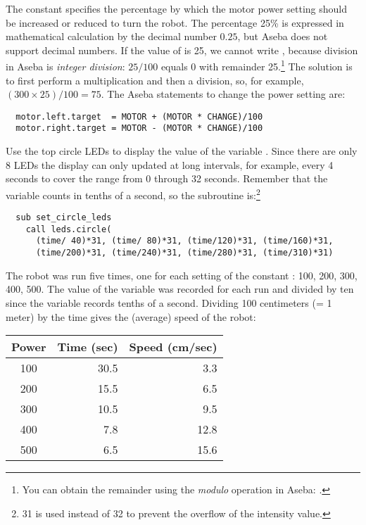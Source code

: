The constant  specifies the percentage by which the motor
power setting  should be increased or reduced to turn the
robot. The percentage 25\% is expressed in mathematical calculation by
the decimal number $0.25$, but Aseba does not support decimal numbers.
If the value of  is 25, we cannot write ,
because division in Aseba is \emph{integer division}: $25/100$ equals 0
with remainder 25.\footnote{You can obtain the remainder using the
\emph{modulo} operation in Aseba: .} The solution is to
first perform a multiplication and then a division, so, for example,
$(300\times 25)/100 = 75$. The Aseba statements to change the power
setting are:

\begin{verbatim}
  motor.left.target  = MOTOR + (MOTOR * CHANGE)/100
  motor.right.target = MOTOR - (MOTOR * CHANGE)/100
\end{verbatim}


Use the top circle LEDs to display the value of the variable .
Since there are only 8 LEDs the display can only updated at long
intervals, for example, every 4 seconds to cover the range from 0
through 32 seconds. Remember that the variable  counts in tenths
of a second, so the subroutine  is:\footnote{31
is used instead of 32 to prevent the overflow of the intensity value.}
\begin{verbatim}
  sub set_circle_leds
    call leds.circle(
      (time/ 40)*31, (time/ 80)*31, (time/120)*31, (time/160)*31,
      (time/200)*31, (time/240)*31, (time/280)*31, (time/310)*31)
\end{verbatim}  


The robot was run five times, one for each setting of the constant : 100, 200, 300,
400, 500. The value of the variable  was recorded for each run
and divided by ten since the variable records tenths of a second.
Dividing 100 centimeters (= 1 meter) by the time gives the (average)
speed of the robot:

\begin{center}\label{tab.speed}
\begin{tabular}{|c|r|r|}\hline
Power  & Time (sec)  &Speed (cm/sec)\\\hline
100&30.5  &3.3\\\hline
200&15.5  &6.5\\\hline
300&10.5  &9.5\\\hline
400&7.8   &12.8\\\hline
500&6.5   &15.6\\\hline
\end{tabular}
\end{center}

